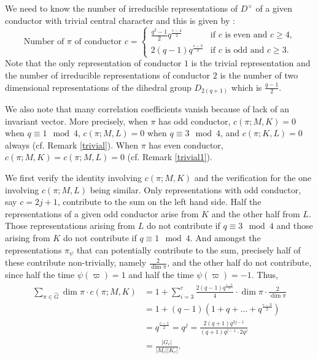 \documentclass[12pt]{amsart}
\theoremstyle{definition}
\theoremstyle{remark}
\begin{document}
We need to know the number of irreducible representations of $D^\times$ of a given conductor with trivial central character and this is given by \cite[Proposition 3.5 and Remark on p. 189]{tun78}:
\[\mbox{Number of~} \pi \mbox{~of conductor~} c = \begin{cases}
\frac{q^2-1}{2}q^{\frac{c-4}{2}} &\text{if $c$ is even and $c \geq 4$,} \\
2(q-1)q^{\frac{c-3}{2}} &\text{if $c$ is odd and $c \geq3$.}
\end{cases}\]
Note that the only representation of conductor $1$ is the trivial representation and the number of irreducible representations of conductor $2$ is the number of two dimensional representations of the dihedral group $D_{2(q+1)}$ which is $\frac{q-1}{2}$. 

We also note that many correlation coefficients vanish because of lack of an invariant vector. More precisely, when $\pi$ has odd conductor, $c(\pi; M, K) = 0$ when $q \equiv 1 \mod 4$, $c(\pi; M, L) = 0$ when $q \equiv 3 \mod 4$,  and $c(\pi; K, L) = 0$ always (cf.  Remark \ref{trivial}). When $\pi$ has even conductor, $c(\pi; M, K) = c(\pi; M, L) = 0$ (cf. Remark \ref{trivial1}).

We first verify the identity involving $c(\pi; M, K)$ and the verification for the one involving $c(\pi;M, L)$ being similar. Only representations with odd conductor, say $c = 2j+1$, contribute to the sum on the left hand side. Half the representations of a given odd conductor arise from $K$ and the other half from $L$. Those representations arising from $L$ do not contribute if $q \equiv 3 \mod 4$ and those arising from $K$ do not contribute if $q \equiv 1 \mod 4$.  And amongst the representations $\pi_\psi$ that can potentially contribute to the sum, precisely half of these contribute non-trivially, namely $\frac{2}{\dim \pi}$, and the other half do not contribute, since half the time $\psi(\varpi) = 1$ and half the time $\psi(\varpi) = -1$. Thus,
\begin{align*}
\sum_{\pi \in \widehat{G}} \dim \pi \cdot c(\pi; M, K) &= 1 + \sum_{i=3}^c \frac{2(q-1)q^{\frac{i-3}{2}}}{4} \cdot \dim \pi \cdot \frac{2}{\dim \pi} \\
&= 1+ (q-1) \left(1+q+\dots+q^{\frac{c-3}{2}} \right) \\
&= q^{\frac{c-1}{2}} = q^j = \frac{2(q+1)q^{3j-1}}{(q+1)q^{j-1} \cdot 2q^j} \\
&= \frac{|G_c|}{|M_c||K_c|}.
\end{align*}
\end{document}
